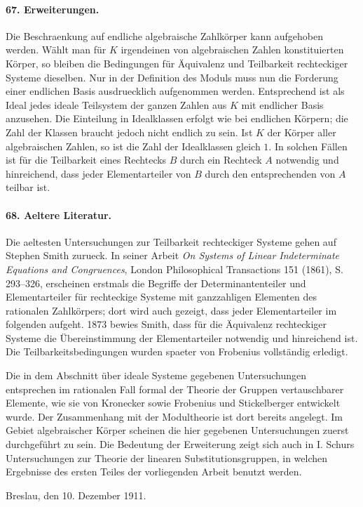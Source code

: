 \documentclass[11pt]{article}
\begin{document}
\paragraph{67. Erweiterungen.}
Die Beschraenkung auf endliche algebraische Zahlkörper kann aufgehoben werden. Wählt man für $K$ irgendeinen von algebraischen Zahlen konstituierten Körper, so bleiben die Bedingungen für Äquivalenz und Teilbarkeit rechteckiger Systeme dieselben. Nur in der Definition des Moduls muss nun die Forderung einer endlichen Basis ausdruecklich aufgenommen werden. Entsprechend ist als Ideal jedes ideale Teilsystem der ganzen Zahlen aus $K$ mit endlicher Basis anzusehen. Die Einteilung in Idealklassen erfolgt wie bei endlichen Körpern; die Zahl der Klassen braucht jedoch nicht endlich zu sein. Ist $K$ der Körper aller algebraischen Zahlen, so ist die Zahl der Idealklassen gleich $1$. In solchen Fällen ist für die Teilbarkeit eines Rechtecks $B$ durch ein Rechteck $A$ notwendig und hinreichend, dass jeder Elementarteiler von $B$ durch den entsprechenden von $A$ teilbar ist.

\paragraph{68. Aeltere Literatur.}
Die aeltesten Untersuchungen zur Teilbarkeit rechteckiger Systeme gehen auf Stephen Smith zurueck. In seiner Arbeit \emph{On Systems of Linear Indeterminate Equations and Congruences}, London Philosophical Transactions 151 (1861), S. 293--326, erscheinen erstmals die Begriffe der Determinantenteiler und Elementarteiler für rechteckige Systeme mit ganzzahligen Elementen des rationalen Zahlkörpers; dort wird auch gezeigt, dass jeder Elementarteiler im folgenden aufgeht. 1873 bewies Smith, dass für die Äquivalenz rechteckiger Systeme die Übereinstimmung der Elementarteiler notwendig und hinreichend ist. Die Teilbarkeitsbedingungen wurden spaeter von Frobenius vollständig erledigt.

Die in dem Abschnitt über ideale Systeme gegebenen Untersuchungen entsprechen im rationalen Fall formal der Theorie der Gruppen vertauschbarer Elemente, wie sie von Kronecker sowie Frobenius und Stickelberger entwickelt wurde. Der Zusammenhang mit der Modultheorie ist dort bereits angelegt. Im Gebiet algebraischer Körper scheinen die hier gegebenen Untersuchungen zuerst durchgeführt zu sein. Die Bedeutung der Erweiterung zeigt sich auch in I. Schurs Untersuchungen zur Theorie der linearen Substitutionsgruppen, in welchen Ergebnisse des ersten Teiles der vorliegenden Arbeit benutzt werden.

Breslau, den 10. Dezember 1911.
\end{document}
